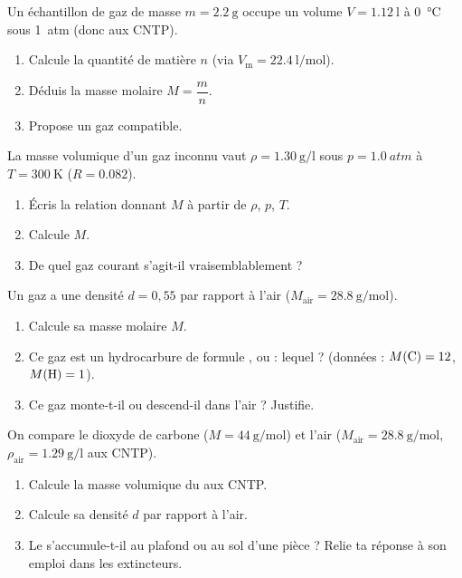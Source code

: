 \documentclass[11pt,a4paper]{article}
\begin{document}
\begin{exo}
Un échantillon de gaz de masse $m=\qty{2.2}{\gram}$ occupe un volume $V=\qty{1.12}{\litre}$ à
\qty{0}{\degreeCelsius} sous \qty{1}{atm} (donc aux CNTP).
\begin{enumerate}[label=\alph*)]
  \item Calcule la quantité de matière $n$ (via $V_{\mathrm{m}}=\qty{22.4}{\litre\per\mole}$).
  \item Déduis la masse molaire $M=\dfrac{m}{n}$.
  \item Propose un gaz compatible.
\end{enumerate}
\end{exo}

\begin{exo}
La masse volumique d'un gaz inconnu vaut $\rho=\qty{1.30}{\gram\per\litre}$ sous $p=\qty{1.0}{atm}$ à
$T=\qty{300}{\kelvin}$ ($R=\num{0,082}$).
\begin{enumerate}[label=\alph*)]
  \item Écris la relation donnant $M$ à partir de $\rho$, $p$, $T$.
  \item Calcule $M$.
  \item De quel gaz courant s'agit-il vraisemblablement ?
\end{enumerate}
\end{exo}

\begin{exo}
Un gaz a une densité $d=0{,}55$ par rapport à l'air ($M_{\text{air}}=\qty{28.8}{\gram\per\mole}$).
\begin{enumerate}[label=\alph*)]
  \item Calcule sa masse molaire $M$.
  \item Ce gaz est un hydrocarbure de formule ,  ou  : lequel ?
        (données : $M(\ce{C})=12$, $M(\ce{H})=1$).
  \item Ce gaz monte-t-il ou descend-il dans l'air ? Justifie.
\end{enumerate}
\end{exo}

\begin{exo}
On compare le dioxyde de carbone  ($M=\qty{44}{\gram\per\mole}$) et l'air
($M_{\text{air}}=\qty{28.8}{\gram\per\mole}$, $\rho_{\text{air}}=\qty{1.29}{\gram\per\litre}$ aux CNTP).
\begin{enumerate}[label=\alph*)]
  \item Calcule la masse volumique du  aux CNTP.
  \item Calcule sa densité $d$ par rapport à l'air.
  \item Le  s'accumule-t-il au plafond ou au sol d'une pièce ? Relie ta réponse à son emploi
        dans les extincteurs.
\end{enumerate}
\end{exo}
\end{document}
